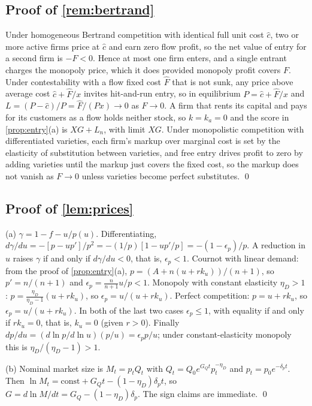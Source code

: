 \subsection*{Proof of \autoref{rem:bertrand}}

Under homogeneous Bertrand competition with identical full unit cost $\hat c$, two or more active firms price at $\hat c$ and earn zero flow profit, so the net value of entry for a second firm is $-F<0$. Hence at most one firm enters, and a single entrant charges the monopoly price, which it does provided monopoly profit covers $F$. Under contestability with a flow fixed cost $\hat F$ that is not sunk, any price above average cost $\hat c+\hat F/x$ invites hit-and-run entry, so in equilibrium $P=\hat c+\hat F/x$ and $L=(P-\hat c)/P=\hat F/(Px)\to 0$ as $F\to 0$. A firm that rents its capital and pays for its customers as a flow holds neither stock, so $k=k_a=0$ and the score in \autoref{prop:entry}(a) is $XG+L_n$, with limit $XG$. Under monopolistic competition with differentiated varieties, each firm's markup over marginal cost is set by the elasticity of substitution between varieties, and free entry drives profit to zero by adding varieties until the markup just covers the fixed cost, so the markup does not vanish as $F\to0$ unless varieties become perfect substitutes. \qed

\subsection*{Proof of \autoref{lem:prices}}

(a) $\gamma=1-f-u/p(u)$. Differentiating, $d\gamma/du=-[p-up']/p^2=-(1/p)[1-up'/p]=-(1-\epsilon_p)/p$. A reduction in $u$ raises $\gamma$ if and only if $d\gamma/du<0$, that is, $\epsilon_p<1$. Cournot with linear demand: from the proof of \autoref{prop:entry}(a), $p=(A+n(u+rk_u))/(n+1)$, so $p'=n/(n+1)$ and $\epsilon_p=\tfrac{n}{n+1}u/p<1$. Monopoly with constant elasticity $\eta_D>1$: $p=\tfrac{\eta_D}{\eta_D-1}(u+rk_u)$, so $\epsilon_p=u/(u+rk_u)$. Perfect competition: $p=u+rk_u$, so $\epsilon_p=u/(u+rk_u)$. In both of the last two cases $\epsilon_p\le 1$, with equality if and only if $rk_u=0$, that is, $k_u=0$ (given $r>0$). Finally $dp/du=(d\ln p/d\ln u)(p/u)=\epsilon_p p/u$; under constant-elasticity monopoly this is $\eta_D/(\eta_D-1)>1$.

(b) Nominal market size is $M_t=p_tQ_t$ with $Q_t=Q_0e^{G_Qt}p_t^{-\eta_D}$ and $p_t=p_0e^{-\delta_pt}$. Then $\ln M_t=\text{const}+G_Qt-(1-\eta_D)\delta_pt$, so $G=d\ln M/dt=G_Q-(1-\eta_D)\delta_p$. The sign claims are immediate. \qed

